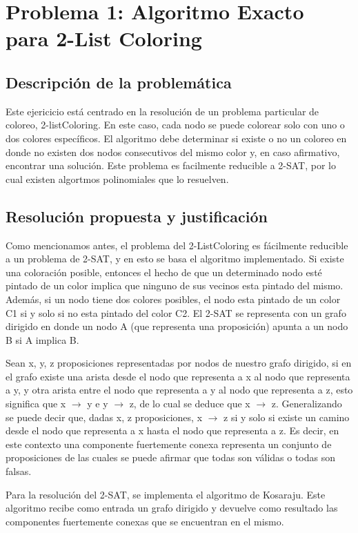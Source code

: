 \newpage
\section{Problema 1: Algoritmo Exacto para 2-List Coloring}

\subsection{Descripción de la problemática}
Este ejericicio está centrado en la resolución de un problema particular de coloreo, 2-listColoring. En este caso, cada nodo se puede colorear solo con uno o dos colores específicos. El algoritmo debe determinar si existe o no un coloreo en donde no existen dos nodos consecutivos del mismo color y, en caso afirmativo, encontrar una solución.
Este problema es facilmente reducible a 2-SAT, por lo cual existen algortmos polinomiales que lo resuelven.

\subsection{Resolución propuesta y justificación}
Como mencionamos antes, el problema del 2-ListColoring es fácilmente reducible a un problema de 2-SAT, y en esto se basa el algoritmo implementado. Si existe una coloración posible, entonces el hecho de que un determinado nodo esté pintado de un color implica que ninguno de sus vecinos esta pintado del mismo. Además, si un nodo tiene dos colores posibles, el nodo esta pintado de un color C1 si y solo si no esta pintado del color C2.
El 2-SAT se representa con un grafo dirigido en donde un nodo A (que representa una proposición) apunta a un nodo B si A implica B.

Sean x, y, z proposiciones representadas por nodos de nuestro grafo dirigido, si en el grafo existe una arista desde el nodo que representa a x al nodo que representa a y, y otra arista entre el nodo que representa a y al nodo que representa a z, esto significa que x $\rightarrow$ y e y $\rightarrow$ z, de lo cual se deduce que x $\rightarrow$ z. Generalizando se puede decir que, dadas x, z proposiciones,  x $\rightarrow$ z si y solo si existe un camino desde el nodo que representa a x hasta el nodo que representa a z. Es decir, en este contexto una componente fuertemente conexa representa un conjunto de proposiciones de las cuales se puede afirmar que todas son válidas o todas son falsas.

Para la resolución del 2-SAT, se implementa el algoritmo de Kosaraju. Este algoritmo recibe como entrada un grafo dirigido y devuelve como resultado las componentes fuertemente conexas que se encuentran en el mismo.

